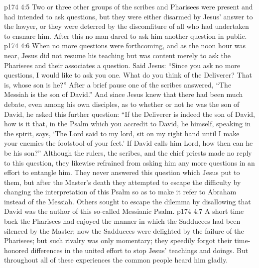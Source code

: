 \pc \vs p174 4:5 Two or three other groups of the scribes and Pharisees were present and had intended to ask questions, but they were either disarmed by Jesus’ answer to the lawyer, or they were deterred by the discomfiture of all who had undertaken to ensnare him. After this no man dared to ask him another question in public.
\vs p174 4:6 When no more questions were forthcoming, and as the noon hour was near, Jesus did not resume his teaching but was content merely to ask the Pharisees and their associates a question. Said Jesus: \textcolor{ubdarkred}{“Since you ask no more questions, I would like to ask you one. What do you think of the Deliverer? That is, whose son is he?”} After a brief pause one of the scribes answered, “The Messiah is the son of David.” And since Jesus knew that there had been much debate, even among his own disciples, as to whether or not he was the son of David, he asked this further question: \textcolor{ubdarkred}{“If the Deliverer is indeed the son of David, how is it that, in the Psalm which you accredit to David, he himself, speaking in the spirit, says, ‘The Lord said to my lord, sit on my right hand until I make your enemies the footstool of your feet.’ If David calls him Lord, how then can he be his son?”} Although the rulers, the scribes, and the chief priests made no reply to this question, they likewise refrained from asking him any more questions in an effort to entangle him. They never answered this question which Jesus put to them, but after the Master’s death they attempted to escape the difficulty by changing the interpretation of this Psalm so as to make it refer to Abraham instead of the Messiah. Others sought to escape the dilemma by disallowing that David was the author of this so\hyp{}called Messianic Psalm.\plusone
\vs p174 4:7 A short time back the Pharisees had enjoyed the manner in which the Sadducees had been silenced by the Master; now the Sadducees were delighted by the failure of the Pharisees; but such rivalry was only momentary; they speedily forgot their time\hyp{}honored differences in the united effort to stop Jesus’ teachings and doings. But throughout all of these experiences the common people heard him gladly.
